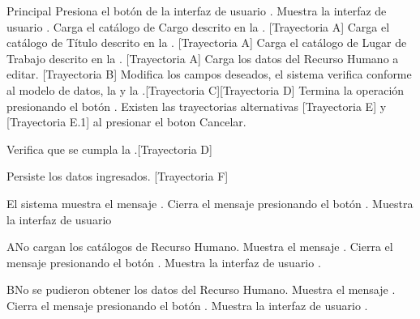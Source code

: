 \begin{UCtrayectoria}{Principal}
    \UCpaso[\UCactor] Presiona el botón  de la interfaz de usuario .
    \UCpaso Muestra la interfaz de usuario .
    \UCpaso Carga el catálogo de Cargo descrito en la . [Trayectoria A]
    \UCpaso Carga el catálogo de Título descrito en la . [Trayectoria A]
    \UCpaso Carga el catálogo de Lugar de Trabajo descrito en la . [Trayectoria A]
    \UCpaso Carga los datos del Recurso Humano a editar. [Trayectoria B]
    \UCpaso[\UCactor] Modifica los campos deseados, el sistema verifica conforme al modelo de datos, la  y la .[Trayectoria C][Trayectoria D]
    \UCpaso[\UCactor] Termina la operación presionando el botón .  Existen las trayectorias alternativas [Trayectoria E] y [Trayectoria E.1] al presionar el boton Cancelar.

    \UCpaso Verifica que se cumpla la .[Trayectoria D]

    \UCpaso Persiste los datos ingresados. [Trayectoria F]

    \UCpaso El sistema muestra el mensaje .
    \UCpaso[\UCactor] Cierra el mensaje presionando el botón .
    \UCpaso Muestra la interfaz de usuario 
\end{UCtrayectoria}
\begin{UCtrayectoriaA}{A}{No cargan los catálogos de Recurso Humano.}
    \UCpaso Muestra el mensaje .
    \UCpaso[\UCactor] Cierra el mensaje presionando el botón .
    \UCpaso Muestra la interfaz de usuario .
\end{UCtrayectoriaA}
\begin{UCtrayectoriaA}{B}{No se pudieron obtener los datos del Recurso Humano.}
    \UCpaso Muestra el mensaje .
    \UCpaso[\UCactor] Cierra el mensaje presionando el botón .
    \UCpaso Muestra la interfaz de usuario .
\end{UCtrayectoriaA}

